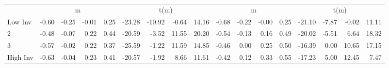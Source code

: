 \begin{table}[!ht]
\begin{tabular}{lrrrrrrrrrrrrrrrr}
  
    
      & \multicolumn{4}{c}{m} & \multicolumn{4}{c}{t(m)}
    
      & \multicolumn{4}{c}{m} & \multicolumn{4}{c}{t(m)}
    
    \\
      \cmidrule(r){2-5} \cmidrule(r){6-9} \cmidrule(r){10-13} \cmidrule(r){14-17}

    Low Inv   & -0.60  & -0.25  & -0.01  & 0.25  & -23.28  & -10.92  & -0.64  & 14.16  & -0.68  & -0.22  & -0.00  & 0.25  & -21.10  & -7.87  & -0.02  & 11.11  \\
           2  & -0.48  & -0.07  & 0.22  & 0.44  & -20.59  & -3.52  & 11.55  & 20.20  & -0.54  & -0.13  & 0.16  & 0.49  & -20.02  & -5.51  & 6.64  & 18.32  \\
           3  & -0.57  & -0.02  & 0.22  & 0.37  & -25.59  & -1.22  & 11.59  & 14.85  & -0.46  & 0.00  & 0.25  & 0.50  & -16.39  & 0.00  & 10.65  & 17.15  \\
    High Inv  & -0.63  & -0.04  & 0.23  & 0.41  & -20.57  & -1.92  & 8.66  & 11.61  & -0.42  & 0.12  & 0.33  & 0.55  & -17.23  & 5.00  & 12.45  & 7.47  \\

  

  \bottomrule
\end{tabular}
\label{tbl:32_Size_BMm_Prior_C97b}
\end{table}
